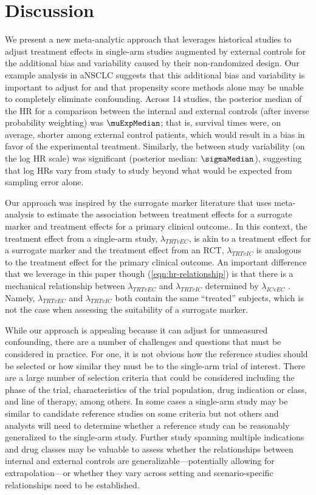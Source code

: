 \documentclass[11pt,final,fleqn]{article}\usepackage[]{graphicx}\usepackage[]{color}
\begin{document}
\section{Discussion} \label{sec:discussion}
We present a new meta-analytic approach that leverages historical studies to adjust treatment effects in single-arm studies augmented by external controls for the additional bias and variability caused by their non-randomized design. Our example analysis in aNSCLC suggests that this additional bias and variability is important to adjust for and that propensity score methods alone may be unable to completely eliminate confounding.  Across 14 studies, the posterior median of the HR for a comparison between the internal and external controls (after inverse probability weighting) was $\muExpMedian$; that is, survival times were, on average, shorter among external control patients, which would result in a bias in favor of the experimental treatment. Similarly, the between study variability (on the log HR scale) was significant (posterior median: $\sigmaMedian$), suggesting that log HRs vary from study to study beyond what would be expected from sampling error alone. 

Our approach was inspired by the surrogate marker literature that uses meta-analysis to estimate the association between treatment effects for a surrogate marker and treatment effects for a primary clinical outcome.\cite{daniels1997meta, burzykowski2006evaluation}. In this context, the treatment effect from a single-arm study, $\lambda_{TRTvEC}$, is akin to a treatment effect for a surrogate marker and the treatment effect from an RCT, $\lambda_{TRTvIC}$ is analogous to the treatment effect for the primary clinical outcome. An important difference that we leverage in this paper though (\autoref{eqn:hr-relationship}) is that there is a mechanical relationship between $\lambda_{TRTvEC}$ and $\lambda_{TRTvIC}$ determined by $\lambda_{ICvEC}$ . Namely,  $\lambda_{TRTvEC}$ and $\lambda_{TRTvIC}$ both contain the same ``treated'' subjects, which is not the case when assessing the suitability of a surrogate marker. 

While our approach is appealing because it can adjust for unmeasured confounding, there are a number of challenges and questions that must be considered in practice. For one, it is not obvious how the reference studies should be selected or how similar they must be to the single-arm trial of interest. There are a large number of selection criteria that could be considered including the phase of the trial, characteristics of the trial population, drug indication or class, and line of therapy, among others. In some cases a single-arm study may be similar to candidate reference studies on some criteria but not others and analysts will need to determine whether a reference study can be reasonably generalized to the single-arm study. Further study spanning multiple indications and drug classes may be valuable to assess whether the relationships between internal and external controls are generalizable---potentially allowing for extrapolation---or whether they vary across setting and scenario-specific relationships need to be established.
\end{document}
